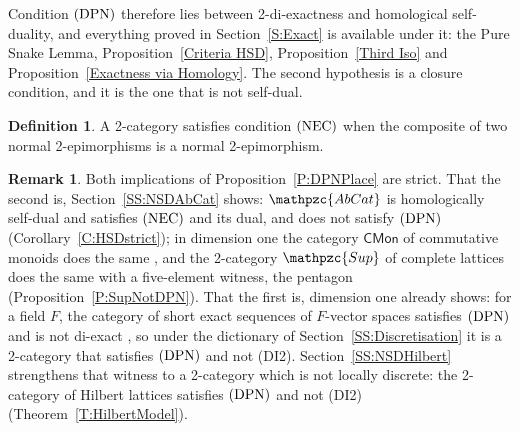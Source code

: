 \documentclass[reqno,a4paper]{amsart}
\numberwithin{equation}{section}
\theoremstyle{plain}
\theoremstyle{definition}
\newtheorem{definition}[subsection]{Definition}
\newtheorem{remark}[subsection]{Remark}
\def\nameit#1{\textrm{#1}~}
\def\thex{\nameit{Theorem}}
\def\prox{\nameit{Proposition}}
\def\corx{\nameit{Corollary}}
\newcommand{\catfont}[1]{\ensuremath{\mathpzc{#1}}\xspace}
\newcommand{\onecat}[1]{\ensuremath{\mathsf{#1}}\xspace}
\newcommand{\AbCat}{\catfont{AbCat}}
\newcommand{\Sup}{\catfont{Sup}}
\renewcommand{\1}{\onecat{1}}
\newcommand{\CMon}{\onecat{CMon}}
\newcommand{\DPN}{\textup{(DPN)}}
\newcommand{\NEC}{\textup{(NEC)}}
\begin{document}
Condition \(\DPN\) therefore lies between 2-di-exactness and homological self-duality, and everything proved in Section~\ref{S:Exact} is available under it: the Pure Snake Lemma, \prox\ref{Criteria HSD}, \prox\ref{Third Iso} and \prox\ref{Exactness via Homology}. The second hypothesis is a closure condition, and it is the one that is not self-dual.

\begin{definition}\label{Def:NEC}
	A 2-category satisfies condition \(\NEC\) when the composite of two normal 2-epimorphisms is a normal 2-epimorphism.
\end{definition}

\begin{remark}\label{Rem NSD Strict}
	Both implications of \prox\ref{P:DPNPlace} are strict. That the second is, Section~\ref{SS:NSDAbCat} shows: \(\AbCat\) is homologically self-dual and satisfies \(\NEC\) and its dual, and does not satisfy \(\DPN\) (\corx\ref{C:HSDstrict}); in dimension one the category \(\CMon\) of commutative monoids does the same \cite[Example~4.2.1]{Afsa-24}, and the 2-category \(\Sup\) of complete lattices does the same with a five-element witness, the pentagon (\prox\ref{P:SupNotDPN}). That the first is, dimension one already shows: for a field \(F\), the category of short exact sequences of \(F\)-vector spaces satisfies \(\DPN\) and is not di-exact \cite[Example~4.3.8]{Afsa-24}, so under the dictionary of Section~\ref{SS:Discretisation} it is a 2-category that satisfies \(\DPN\) and not \textup{(DI2)}. Section~\ref{SS:NSDHilbert} strengthens that witness to a 2-category which is not locally discrete: the 2-category of Hilbert lattices satisfies \(\DPN\) and not \textup{(DI2)} (\thex\ref{T:HilbertModel}).
\end{remark}
\end{document}
